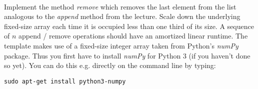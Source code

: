  \\
Implement the method \textit{remove} which removes the last element from the
list analogous to the \textit{append} method from the lecture.
Scale down the underlying fixed-size array each time it is occupied less than
one third of its size.
A sequence of $n$ append / remove operations should have an amortized linear
runtime. The template makes use of a fixed-size integer array taken 
from Python's \textit{numPy} package. Thus you first have to install \textit{numPy} for Python 3 (if you haven't done so yet). You can do this e.g. directly on the command line by typing:

\texttt{sudo apt-get install python3-numpy}
